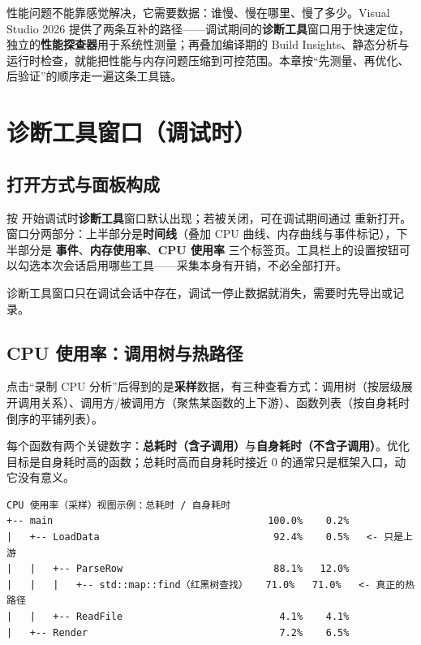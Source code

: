 
性能问题不能靠感觉解决，它需要数据：谁慢、慢在哪里、慢了多少。Visual Studio 2026 提供了两条互补的路径——调试期间的\textbf{诊断工具}窗口用于快速定位，独立的\textbf{性能探查器}用于系统性测量；再叠加编译期的 Build Insights、静态分析与运行时检查，就能把性能与内存问题压缩到可控范围。本章按“先测量、再优化、后验证”的顺序走一遍这条工具链。

\section{诊断工具窗口（调试时）}
\subsection{打开方式与面板构成}
按  开始调试时\textbf{诊断工具}窗口默认出现；若被关闭，可在调试期间通过  重新打开。窗口分两部分：上半部分是\textbf{时间线}（叠加 CPU 曲线、内存曲线与事件标记），下半部分是 \textbf{事件}、\textbf{内存使用率}、\textbf{CPU 使用率} 三个标签页。工具栏上的设置按钮可以勾选本次会话启用哪些工具——采集本身有开销，不必全部打开。

\begin{warnbox}[注意]
诊断工具窗口只在调试会话中存在，调试一停止数据就消失，需要时先导出或记录。
\end{warnbox}

\subsection{CPU 使用率：调用树与热路径}
点击“录制 CPU 分析”后得到的是\textbf{采样}数据，有三种查看方式：调用树（按层级展开调用关系）、调用方/被调用方（聚焦某函数的上下游）、函数列表（按自身耗时倒序的平铺列表）。

每个函数有两个关键数字：\textbf{总耗时（含子调用）}与\textbf{自身耗时（不含子调用）}。优化目标是自身耗时高的函数；总耗时高而自身耗时接近 0 的通常只是框架入口，动它没有意义。

\begin{lstlisting}[style=textstyle]
CPU 使用率（采样）视图示例：总耗时 / 自身耗时
+-- main                                     100.0%    0.2%
|   +-- LoadData                              92.4%    0.5%   <- 只是上游
|   |   +-- ParseRow                          88.1%   12.0%
|   |   |   +-- std::map::find（红黑树查找）   71.0%   71.0%   <- 真正的热路径
|   |   +-- ReadFile                           4.1%    4.1%
|   +-- Render                                 7.2%    6.5%
\end{lstlisting}

